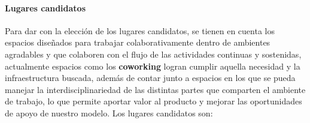 \paragraph*{Lugares candidatos}

Para dar con la elección de los lugares candidatos, se tienen en cuenta los espacios diseñados para trabajar colaborativamente dentro de ambientes agradables y que colaboren con el flujo de las actividades continuas y sostenidas, actualmente espacios como los \textbf{coworking} logran cumplir aquella necesidad y la infraestructura buscada, además de contar junto a espacios en los que se pueda manejar la interdisciplinariedad de las distintas partes que comparten el ambiente de trabajo, lo que permite aportar valor al producto y mejorar las oportunidades de apoyo de nuestro modelo. Los lugares candidatos son:

